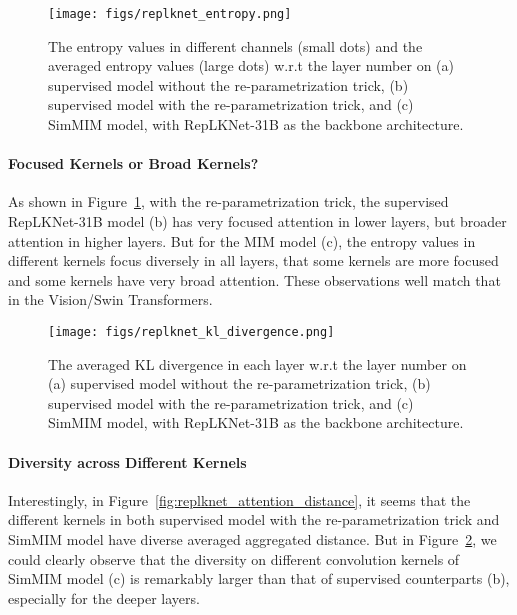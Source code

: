\documentclass{article}
\begin{document}
\begin{figure}[h]
    \centering
    \texttt{[image: figs/replknet\_entropy.png]}
    \caption{The entropy values in different channels (small dots) and the averaged entropy values (large dots) w.r.t the layer number on (a) supervised model without the re-parametrization trick, (b) supervised model with the re-parametrization trick, and (c) SimMIM model, with RepLKNet-31B as the backbone architecture.}
    \label{fig:replknet_entropy}
\end{figure}



\paragraph{Focused Kernels or Broad Kernels?} 
As shown in  Figure~\ref{fig:replknet_entropy}, with the re-parametrization trick, the supervised RepLKNet-31B model (b) has very focused attention in lower layers, but broader attention in higher layers. But for the MIM model (c), the entropy values in different kernels focus diversely in all layers, that some kernels are more focused and some kernels have very broad attention. These observations well match that in the Vision/Swin Transformers.


\begin{figure}[h]
    \centering
    \texttt{[image: figs/replknet\_kl\_divergence.png]}
    \caption{The averaged KL divergence in each layer w.r.t the layer number on (a) supervised model without the re-parametrization trick, (b) supervised model with the re-parametrization trick, and (c) SimMIM model, with RepLKNet-31B as the backbone architecture.}
    \label{fig:replknet_kl_divergence}
\end{figure}

\paragraph{Diversity across Different Kernels}


Interestingly, in Figure~\ref{fig:replknet_attention_distance}, it seems that the different kernels in both supervised model with the re-parametrization trick and SimMIM model have diverse averaged aggregated distance. But in Figure~\ref{fig:replknet_kl_divergence}, we could clearly observe that the diversity on different convolution kernels of SimMIM model (c) is remarkably larger than that of supervised counterparts (b), especially for the deeper layers.
\end{document}
